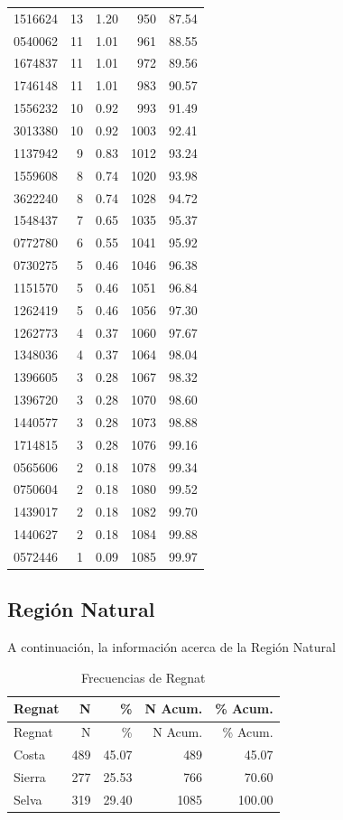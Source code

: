 \documentclass[
]{article}
\begin{document}
\begin{longtable}[]{@{}lrrrr@{}}
1516624 & 13 & 1.20 & 950 & 87.54 \\
0540062 & 11 & 1.01 & 961 & 88.55 \\
1674837 & 11 & 1.01 & 972 & 89.56 \\
1746148 & 11 & 1.01 & 983 & 90.57 \\
1556232 & 10 & 0.92 & 993 & 91.49 \\
3013380 & 10 & 0.92 & 1003 & 92.41 \\
1137942 & 9 & 0.83 & 1012 & 93.24 \\
1559608 & 8 & 0.74 & 1020 & 93.98 \\
3622240 & 8 & 0.74 & 1028 & 94.72 \\
1548437 & 7 & 0.65 & 1035 & 95.37 \\
0772780 & 6 & 0.55 & 1041 & 95.92 \\
0730275 & 5 & 0.46 & 1046 & 96.38 \\
1151570 & 5 & 0.46 & 1051 & 96.84 \\
1262419 & 5 & 0.46 & 1056 & 97.30 \\
1262773 & 4 & 0.37 & 1060 & 97.67 \\
1348036 & 4 & 0.37 & 1064 & 98.04 \\
1396605 & 3 & 0.28 & 1067 & 98.32 \\
1396720 & 3 & 0.28 & 1070 & 98.60 \\
1440577 & 3 & 0.28 & 1073 & 98.88 \\
1714815 & 3 & 0.28 & 1076 & 99.16 \\
0565606 & 2 & 0.18 & 1078 & 99.34 \\
0750604 & 2 & 0.18 & 1080 & 99.52 \\
1439017 & 2 & 0.18 & 1082 & 99.70 \\
1440627 & 2 & 0.18 & 1084 & 99.88 \\
0572446 & 1 & 0.09 & 1085 & 99.97 \\
\end{longtable}

\subsection{Región Natural}\label{regiuxf3n-natural}

A continuación, la información acerca de la Región Natural

\begin{longtable}[]{@{}lrrrr@{}}
\caption{Frecuencias de Regnat}\tabularnewline
\toprule\noalign{}
Regnat & N & \% & N Acum. & \% Acum. \\
\midrule\noalign{}
\endfirsthead
\toprule\noalign{}
Regnat & N & \% & N Acum. & \% Acum. \\
\midrule\noalign{}
\endhead
\bottomrule\noalign{}
\endlastfoot
Costa & 489 & 45.07 & 489 & 45.07 \\
Sierra & 277 & 25.53 & 766 & 70.60 \\
Selva & 319 & 29.40 & 1085 & 100.00 \\
\end{longtable}
\end{document}
